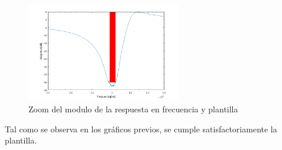 \documentclass[../../tc_tp5_main.tex]{subfiles}
\begin{document}
\begin{figure}[H]	
	\centering
	\includegraphics[width=0.6\textwidth]{imagenes/Zmagplant.png}
	\caption{Zoom del modulo de la respuesta en frecuencia y plantilla}
\end{figure}

Tal como se observa en los gráficos previos, se cumple satisfactoriamente la plantilla.



\clearpage\newpage
\end{document}
